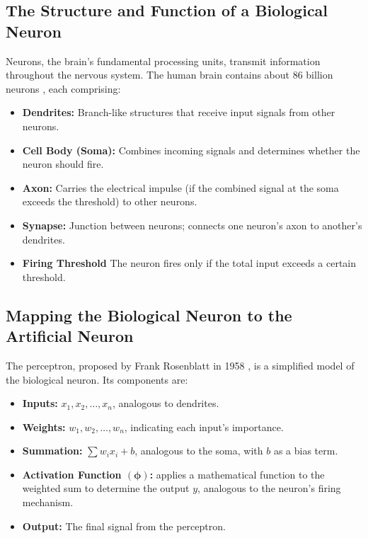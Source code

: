 \documentclass[9pt]{extarticle}
\begin{document}
\subsection{The Structure and Function of a Biological Neuron}
Neurons, the brain’s fundamental processing units, transmit information
throughout the nervous system. The human brain contains about 86 billion
neurons \cite{harvard_brain}, each comprising:
\begin{itemize}
    \item \textbf{Dendrites:} Branch-like structures that receive input signals from other neurons.
    \item \textbf{Cell Body (Soma):} Combines incoming signals and determines whether the neuron should fire.
    \item \textbf{Axon:} Carries the electrical impulse (if the combined signal at the soma exceeds the threshold) to other neurons.
    \item \textbf{Synapse:} Junction between neurons; connects one neuron's axon to another's dendrites.
    \item \textbf{Firing Threshold} The neuron fires only if the total input exceeds a certain threshold.
\end{itemize}
\subsection{Mapping the Biological Neuron to the Artificial Neuron}
The perceptron, proposed by Frank Rosenblatt in 1958 \cite{rosenblatt_perceptron}, is a simplified model of the biological neuron. Its components are:
\begin{itemize}
    \item \textbf{Inputs:} $x_1, x_2, \ldots, x_n$, analogous to dendrites.
    \item \textbf{Weights:} $w_1, w_2, \ldots, w_n$, indicating each input's importance.
    \item \textbf{Summation:} $\sum w_i x_i + b$, analogous to the soma, with $b$ as a bias term.
    \item \textbf{Activation Function $(\boldsymbol{\phi})$:} applies a mathematical function to the weighted sum to determine the output $y$, analogous to the neuron's firing mechanism.
    \item \textbf{Output:} The final signal from the perceptron.
\end{itemize}
\end{document}

